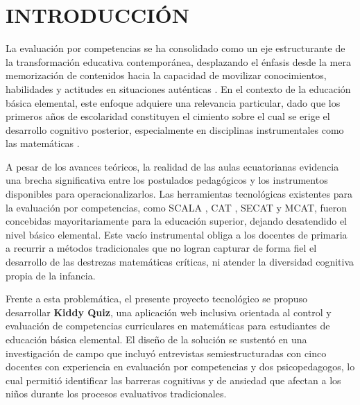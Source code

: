 
\chapter*{INTRODUCCIÓN}

La evaluación por competencias se ha consolidado como un eje estructurante de la transformación educativa contemporánea, desplazando el énfasis desde la mera memorización de contenidos hacia la capacidad de movilizar conocimientos, habilidades y actitudes en situaciones auténticas \cite{ref01_evalcompetencias,ref33_cano}. En el contexto de la educación básica elemental, este enfoque adquiere una relevancia particular, dado que los primeros años de escolaridad constituyen el cimiento sobre el cual se erige el desarrollo cognitivo posterior, especialmente en disciplinas instrumentales como las matemáticas \cite{ref35_pisa,ref36_niss}.

A pesar de los avances teóricos, la realidad de las aulas ecuatorianas evidencia una brecha significativa entre los postulados pedagógicos y los instrumentos disponibles para operacionalizarlos. Las herramientas tecnológicas existentes para la evaluación por competencias, como SCALA \cite{ref21_scala_universidad}, CAT \cite{ref10_cat}, SECAT \cite{ref11_secat} y MCAT, fueron concebidas mayoritariamente para la educación superior, dejando desatendido el nivel básico elemental. Este vacío instrumental obliga a los docentes de primaria a recurrir a métodos tradicionales que no logran capturar de forma fiel el desarrollo de las destrezas matemáticas críticas, ni atender la diversidad cognitiva propia de la infancia.

Frente a esta problemática, el presente proyecto tecnológico se propuso desarrollar \textbf{Kiddy Quiz}, una aplicación web inclusiva orientada al control y evaluación de competencias curriculares en matemáticas para estudiantes de educación básica elemental. El diseño de la solución se sustentó en una investigación de campo que incluyó entrevistas semiestructuradas con cinco docentes con experiencia en evaluación por competencias y dos psicopedagogos, lo cual permitió identificar las barreras cognitivas y de ansiedad que afectan a los niños durante los procesos evaluativos tradicionales.

